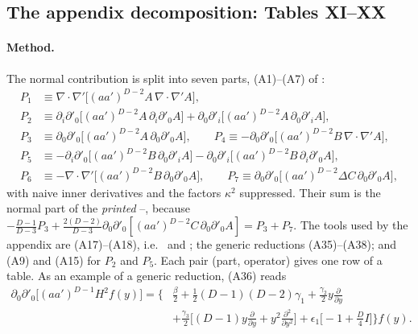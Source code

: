 \subsection{The appendix decomposition: Tables XI--XX \texorpdfstring{\tD\ \tC}{}}
\label{ch6:appendix}

\paragraph{Method.} The normal contribution is split into seven parts, (A1)--(A7) of \PI:
\begin{equation}
\begin{aligned}
P_1&\equiv\nabla\!\cdot\!\nabla'\big[(aa')^{D-2}A\,\nabla\!\cdot\!\nabla'A\big],\\
P_2&\equiv\partial_i\partial'_0\big[(aa')^{D-2}A\,\partial_i\partial'_0A\big]+\partial_0\partial'_i\big[(aa')^{D-2}A\,\partial_0\partial'_iA\big],\\
P_3&\equiv\partial_0\partial'_0\big[(aa')^{D-2}A\,\partial_0\partial'_0A\big],\qquad
P_4\equiv-\partial_0\partial'_0\big[(aa')^{D-2}B\,\nabla\!\cdot\!\nabla'A\big],\\
P_5&\equiv-\partial_i\partial'_0\big[(aa')^{D-2}B\,\partial_0\partial'_iA\big]-\partial_0\partial'_i\big[(aa')^{D-2}B\,\partial_i\partial'_0A\big],\\
P_6&\equiv-\nabla\!\cdot\!\nabla'\big[(aa')^{D-2}B\,\partial_0\partial'_0A\big],\qquad
P_7\equiv\partial_0\partial'_0\big[(aa')^{D-2}\Delta C\,\partial_0\partial'_0A\big],
\end{aligned}
\end{equation}
with naive inner derivatives and the factors $\kappa^2$ suppressed. Their sum is the normal part of the \emph{printed} --, because
$-\frac{D-1}{D-3}P_3+\frac{2(D-2)}{D-3}\partial_0\partial'_0[(aa')^{D-2}C\,\partial_0\partial'_0A]=P_3+P_7$. The tools used by the appendix are
(A17)--(A18), i.e.\  and ; the generic reductions (A35)--(A38); and (A9) and (A15) for $P_2$ and $P_5$. Each pair
(part, operator) gives one row of a table. As an example of a generic reduction, (A36) reads
\begin{equation}
\begin{split}
\partial_0\partial'_0\big[(aa')^{D-1}H^2f(y)\big]=\Big\{&\frac\beta2+\frac12(D-1)(D-2)\gamma_1+\frac{\gamma_2}{2}y\frac{\partial}{\partial y}\\
&+\frac{\gamma_3}{2}\Big[(D-1)y\frac{\partial}{\partial y}+y^2\frac{\partial^2}{\partial y^2}\Big]+\epsilon_1\Big[-1+\frac D4I\Big]\Big\}f(y).
\end{split}
\end{equation}

